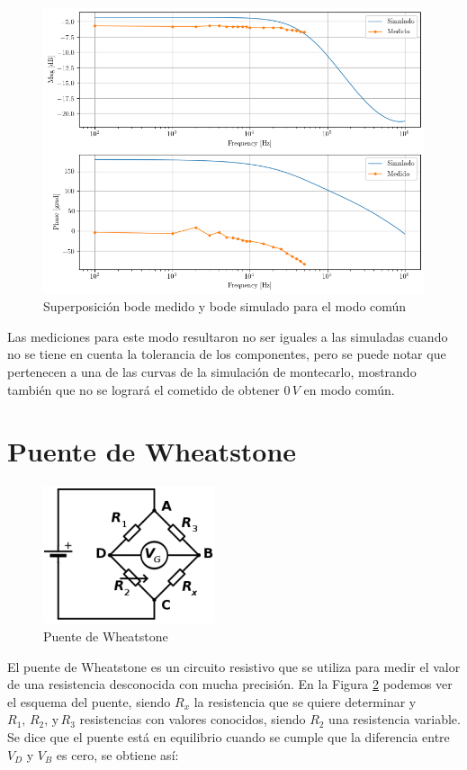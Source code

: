 \documentclass[11pt, a4paper]{article}
\begin{document}
\begin{figure}[H]
\centering
\includegraphics[scale=0.6]{Bode-COMun.png}
\caption{Superposición bode medido y bode simulado para el modo común}
\label{fig:bodemedidocomun}
\end{figure}

	Las mediciones para este modo resultaron no ser iguales a las simuladas cuando no se tiene en cuenta la tolerancia de los componentes, pero se puede notar que pertenecen a una de las curvas de la simulación de montecarlo, mostrando también que no se logrará el cometido de obtener $0 \, V$ en modo común.
	
\section{Puente de Wheatstone}

\begin{figure}[H]
\centering
\includegraphics[scale=0.6]{puente.png}
\caption{Puente de Wheatstone}
\label{fig:puente}
\end{figure}

	El puente de Wheatstone es un circuito resistivo que se utiliza para medir el valor de una resistencia desconocida con mucha precisión.
	En la Figura \ref{fig:puente} podemos ver el esquema del puente, siendo $R_x$ la resistencia que se quiere determinar y $R_1, \, R_2, \, \text{y} \, R_3$ resistencias con valores conocidos, siendo $R_2$ una resistencia variable. Se dice que el puente está en equilibrio cuando se cumple que la diferencia entre $V_D$ y $V_B$ es cero, se obtiene así:
	
\end{document}
